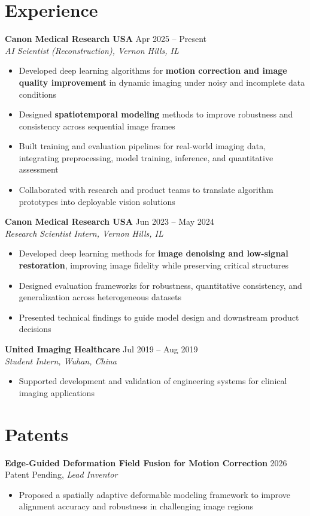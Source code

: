 \section{Experience}
\textbf{Canon Medical Research USA} \hfill Apr 2025 -- Present \\
\textit{AI Scientist (Reconstruction), Vernon Hills, IL}
\begin{itemize}[leftmargin=*]
\item Developed deep learning algorithms for \textbf{motion correction and image quality improvement} in dynamic imaging under noisy and incomplete data conditions
\item Designed \textbf{spatiotemporal modeling} methods to improve robustness and consistency across sequential image frames
\item Built training and evaluation pipelines for real-world imaging data, integrating preprocessing, model training, inference, and quantitative assessment
\item Collaborated with research and product teams to translate algorithm prototypes into deployable vision solutions
\end{itemize}

\textbf{Canon Medical Research USA} \hfill Jun 2023 -- May 2024 \\
\textit{Research Scientist Intern, Vernon Hills, IL}
\begin{itemize}[leftmargin=*]
\item Developed deep learning methods for \textbf{image denoising and low-signal restoration}, improving image fidelity while preserving critical structures
\item Designed evaluation frameworks for robustness, quantitative consistency, and generalization across heterogeneous datasets
\item Presented technical findings to guide model design and downstream product decisions
\end{itemize}

\textbf{United Imaging Healthcare} \hfill Jul 2019 -- Aug 2019 \\
\textit{Student Intern, Wuhan, China}
\begin{itemize}[leftmargin=*]
\item Supported development and validation of engineering systems for clinical imaging applications
\end{itemize}

\section{Patents}
\textbf{Edge-Guided Deformation Field Fusion for Motion Correction} \hfill 2026 \\
Patent Pending, \textit{Lead Inventor}
\begin{itemize}[leftmargin=*]
\item Proposed a spatially adaptive deformable modeling framework to improve alignment accuracy and robustness in challenging image regions
\end{itemize}

